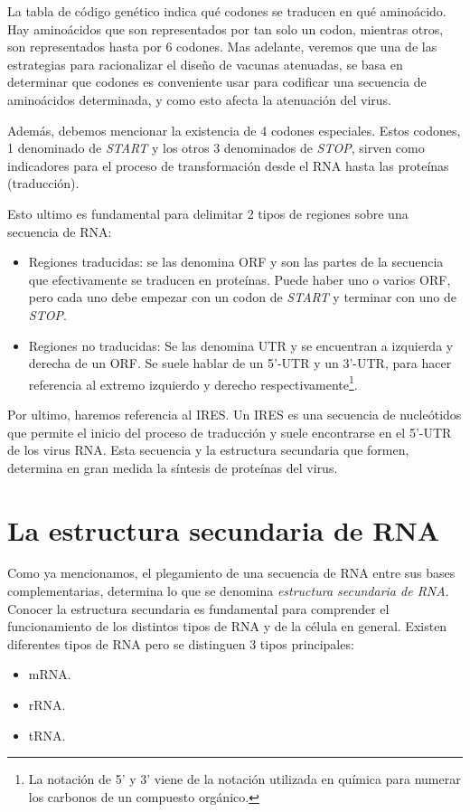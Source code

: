 La tabla de c\'odigo gen\'etico indica qu\'e codones se traducen en qu\'e
amino\'acido. Hay amino\'acidos que son representados por tan solo un codon,
mientras otros, son representados hasta por 6 codones. Mas adelante, veremos que
una de las estrategias para racionalizar el dise\~no de vacunas atenuadas, se
basa en determinar que codones es conveniente usar para codificar una secuencia
de amino\'acidos determinada, y como esto afecta la atenuaci\'on del virus.

Adem\'as, debemos mencionar la existencia de 4 codones especiales. Estos
codones, 1 denominado de \textit{START} y los otros 3 denominados de
\textit{STOP}, sirven como indicadores para el proceso de transformaci\'on desde
el \ac{RNA} hasta las prote\'inas (traducci\'on).

Esto ultimo es fundamental para delimitar 2 tipos de regiones sobre una
secuencia de \ac{RNA}:
\begin{itemize}
 \item Regiones traducidas: se las denomina \ac{ORF} y son las partes de la
secuencia que efectivamente se traducen en prote\'inas. Puede haber uno o varios
\ac{ORF}, pero cada uno debe empezar con un codon de \textit{START} y terminar
con uno de \textit{STOP}.
 \item Regiones no traducidas: Se las denomina \ac{UTR} y se encuentran a
izquierda y derecha de un \ac{ORF}. Se suele hablar de un 5'-\ac{UTR} y un
3'-\ac{UTR}, para hacer referencia al extremo izquierdo y derecho
respectivamente\footnote{La notaci\'on de 5' y 3' viene de la notaci\'on
utilizada en qu\'imica para numerar los carbonos de un compuesto org\'anico.}.
\end{itemize}

Por ultimo, haremos referencia al \ac{IRES}. Un \ac{IRES} es una secuencia de
nucle\'otidos que permite el inicio del proceso de traducci\'on y suele
encontrarse en el 5'-\ac{UTR} de los virus \ac{RNA}. Esta secuencia y la
estructura secundaria que formen, determina en gran medida la s\'intesis de
prote\'inas del virus.

\section{La estructura secundaria de \ac{RNA}}
\label{estructura}
Como ya mencionamos, el plegamiento de una secuencia de \ac{RNA} entre sus bases
complementarias, determina lo que se denomina \textit{estructura secundaria de
\ac{RNA}}. Conocer la estructura secundaria es fundamental para comprender el
funcionamiento de los distintos tipos de \ac{RNA} y de la c\'elula en general.
Existen diferentes tipos de \ac{RNA} pero se distinguen 3 tipos principales: 
\begin{itemize}
 \item \ac{mRNA}.
 \item \ac{rRNA}.
 \item \ac{tRNA}. 
\end{itemize}

